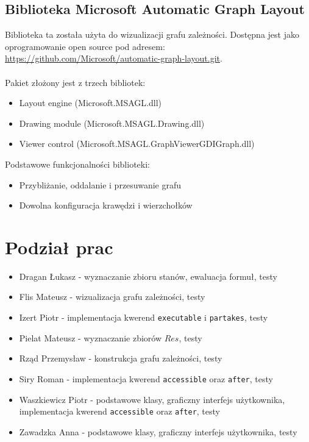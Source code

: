 \documentclass{article}
\begin{document}
\subsection{Biblioteka Microsoft Automatic Graph Layout}
Biblioteka ta została użyta do wizualizacji grafu zależności. Dostępna jest jako oprogramowanie open source pod adresem: \\ \url{https://github.com/Microsoft/automatic-graph-layout.git}. \\\\
Pakiet złożony jest z trzech bibliotek:
\begin{itemize}
    \item Layout engine (Microsoft.MSAGL.dll)
    \item Drawing module (Microsoft.MSAGL.Drawing.dll)
    \item Viewer control (Microsoft.MSAGL.GraphViewerGDIGraph.dll)
\end{itemize}
Podstawowe funkcjonalności biblioteki:
\begin{itemize}
    \item Przybliżanie, oddalanie i przesuwanie grafu
    \item Dowolna konfiguracja krawędzi i wierzchołków
\end{itemize}

\newpage
\section{Podział prac}
\begin{itemize}
    \item Dragan Łukasz - wyznaczanie zbioru stanów, ewaluacja formuł, testy
    \item Flis Mateusz - wizualizacja grafu zależności, testy
    \item Izert Piotr - implementacja kwerend \texttt{executable} i \texttt{partakes}, testy
    \item Pielat Mateusz - wyznaczanie zbiorów $Res$, testy
    \item Rząd Przemysław - konstrukcja grafu zależności, testy
    \item Siry Roman - implementacja kwerend \texttt{accessible} oraz \texttt{after}, testy 
	\item Waszkiewicz Piotr - podstawowe klasy, graficzny interfejs użytkownika, implementacja kwerend \texttt{accessible} oraz \texttt{after}, testy
    \item Zawadzka Anna - podstawowe klasy, graficzny interfejs użytkownika, testy
\end{itemize}
\end{document}
